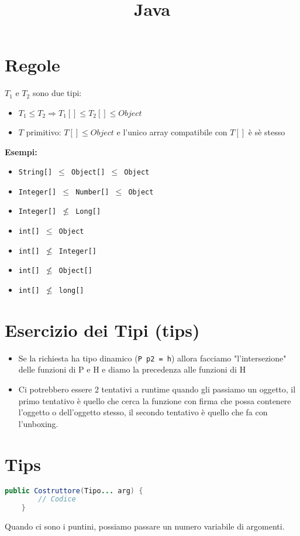 \documentclass[10pt]{article}
\title{Java}
\author{}
\date{}
\begin{document}
\maketitle
{}
\section{Regole}
$T_{1} \text{ e } T_{2}$ sono due tipi:
\begin{itemize}
    \item $T_{1}\leq T_{2}\Rightarrow T_{1}[]\leq T_{2}[] \leq Object$
    \item $T$ primitivo: $T[]\leq Object$ e l'unico array compatibile con $T[]$ è sè stesso
\end{itemize}
\textbf{Esempi:}
\begin{itemize}
    \item \texttt{String[] $\leq$ Object[] $\leq$ Object}
    \item \texttt{Integer[] $\leq$ Number[] $\leq$ Object}
    \item \texttt{Integer[] $\nleq$ Long[]}
    \item \texttt{int[] $\leq$ Object}
    \item \texttt{int[] $\nleq$ Integer[]}
    \item \texttt{int[] $\nleq$ Object[]}
    \item \texttt{int[] $\nleq$ long[]}
\end{itemize}
\section{Esercizio dei Tipi (tips)}
\begin{itemize}
    \item Se la richiesta ha tipo dinamico (\texttt{P p2 = h}) allora facciamo "l'intersezione" delle funzioni di P e H e diamo la precedenza alle funzioni di H
    \item Ci potrebbero essere 2 tentativi a runtime quando gli passiamo un oggetto, il primo tentativo è quello che cerca la funzione con firma che possa contenere l'oggetto o dell'oggetto stesso, il secondo tentativo è quello che fa con l'unboxing.
\end{itemize}
\section{Tips}
\begin{lstlisting}[language=Java]
    public Costruttore(Tipo... arg) {
        // Codice
    }
\end{lstlisting}
Quando ci sono i puntini, possiamo passare un numero variabile di argomenti.
\end{document}
